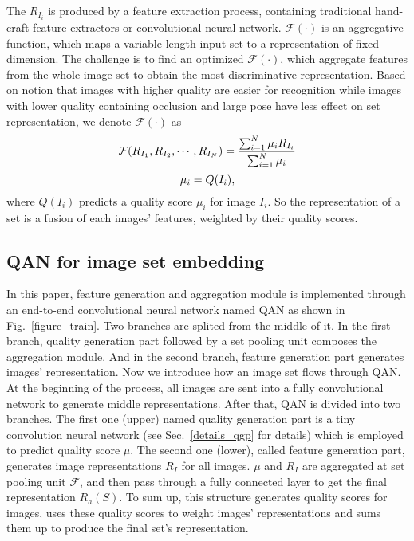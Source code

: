 \documentclass[10pt,twocolumn,letterpaper]{article}
\begin{document}
The $R_{I_i}$ is produced by a feature extraction process, containing  traditional hand-craft feature extractors or convolutional neural network.  $\mathcal{F}(\cdot)$ is an aggregative function, which maps a variable-length input set to a representation of fixed dimension. The challenge is to find an optimized $\mathcal{F}(\cdot)$, which aggregate features from the whole image set to obtain the most discriminative representation. 
Based on notion that images with higher quality are easier for recognition while images with lower quality containing occlusion and large pose have less effect on set representation, we denote $\mathcal{F}(\cdot)$ as
\begin{equation}
\small
\label{5}
\mathcal{F}(R_{I_1}, R_{I_2}, \cdots, R_{I_N}) =\frac{\sum_{i=1}^N\mu_i R_{I_i}}{\sum_{i=1}^N\mu_i }
\end{equation}
\begin{equation}
\small
\label{6}
\mu_i = Q(I_i),
\end{equation}
where $Q(I_i)$ predicts a quality score $\mu_i$ for image $I_i$. So the representation of a set is a fusion of each images' features, weighted by their quality scores.

\subsection{QAN for image set embedding}
In this paper, feature generation and aggregation module is implemented through an end-to-end convolutional neural network named QAN as shown in Fig.~\ref{figure_train}. Two branches are splited from the middle of it. In the first branch, quality generation part followed by a set pooling unit composes the aggregation module. And in the second branch, feature generation part  generates images' representation. Now we introduce how an image set flows through QAN. At the beginning of the process, all images are sent into a fully convolutional network to generate middle representations. After that,
QAN is divided into two branches. The first one (upper) named quality generation part is a tiny convolution neural network (see Sec.~\ref{details_qgp} for details) which is employed to predict quality score $\mu$. The second one (lower), called feature generation part,  generates image representations $R_I$ for all images. $\mu$ and $R_I$ are aggregated at set pooling unit $\mathcal{F}$, and then pass through a fully connected layer to get the final representation $R_a(S)$. To sum up, this structure generates quality scores for images, uses these quality scores to weight images' representations and sums them up to produce the final set's representation.
\end{document}
